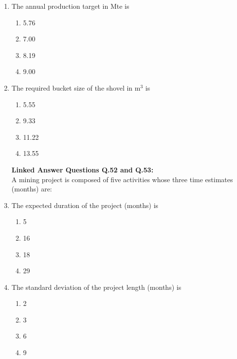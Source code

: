 \documentclass[journal]{IEEEtran}
\begin{document}
\begin{enumerate}[leftmargin=0pt]
\item The annual production target in Mte is
\begin{multicols}{2}
\begin{enumerate}[label=(\Alph*), itemsep=0pt, topsep=2pt]
  \item 5.76
  \item 7.00
  \item 8.19
  \item 9.00
\end{enumerate}
\end{multicols}
\hfill{}

\item The required bucket size of the shovel in m$^3$ is
\begin{multicols}{2}
\begin{enumerate}[label=(\Alph*), itemsep=0pt, topsep=2pt]
  \item 5.55
  \item 9.33
  \item 11.22
  \item 13.55
\end{enumerate}
\end{multicols}
\hfill{}

\noindent\textbf{Linked Answer Questions Q.52 and Q.53:}\\
A mining project is composed of five activities whose three time estimates (months) are:


\item The expected duration of the project (months) is
\begin{multicols}{2}
\begin{enumerate}[label=(\Alph*), itemsep=0pt, topsep=2pt]
  \item 5
  \item 16
  \item 18
  \item 29
\end{enumerate}
\end{multicols}
\hfill{}

\item The standard deviation of the project length (months) is
\begin{multicols}{2}
\begin{enumerate}[label=(\Alph*), itemsep=0pt, topsep=2pt]
  \item 2
  \item 3
  \item 6
  \item 9
\end{enumerate}
\end{multicols}
\hfill{}


\end{enumerate}
\end{document}
